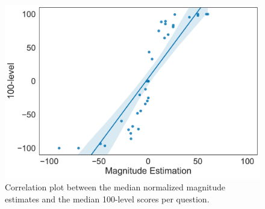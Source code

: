 \begin{figure}
    \centering
    \includegraphics[scale=.4]{Figures/correlation.pdf}
    \caption{Correlation plot between the median normalized magnitude estimates and the median 100-level scores per question.}
    \label{fig:correlation}
\end{figure}

